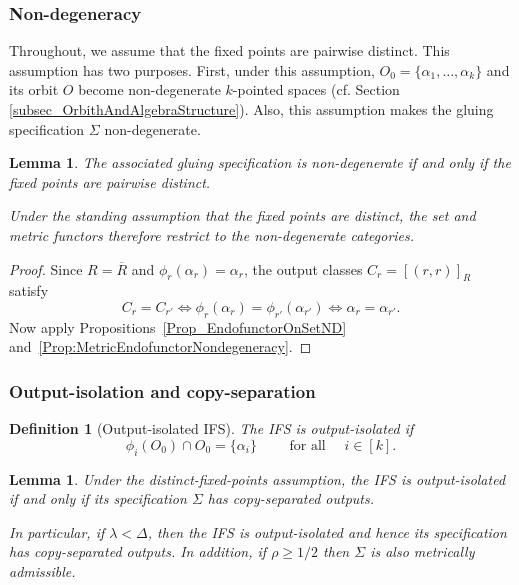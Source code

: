 \documentclass{sn-jnl}%
\theoremstyle{thmstyleone}%
\newtheorem{lemma}[theorem]{Lemma}%
\theoremstyle{thmstyletwo}%
\theoremstyle{thmstylethree}%
\newtheorem{definition}{Definition}%
\newcommand{\f}{\phi}
\newcommand{\w}{\rho}
\begin{document}
\subsubsection{Non-degeneracy}

Throughout, we assume that the fixed points are pairwise distinct. This assumption has two purposes. First, under this assumption, $O_0=\{\alpha_1,\ldots,\alpha_k\}$ and its orbit $O$ become non-degenerate $k$-pointed spaces (cf. Section \ref{subsec_OrbithAndAlgebraStructure}). Also, this assumption makes the gluing specification $\Sigma$ non-degenerate.  

\begin{lemma}
\label{lem:ND-distinct-fixed-points}
    The associated gluing specification is non-degenerate if and only if the fixed points are pairwise distinct. 

    Under the standing assumption that the fixed points are distinct, the set and metric functors therefore restrict to the non-degenerate categories.
\end{lemma}

\begin{proof}
Since $R=\overline R$ and $\f_r(\alpha_r)=\alpha_r$, the output classes $C_r=[(r,r)]_R$ satisfy
\begin{equation} 
\nonumber
    C_r=C_{r'} \iff \f_r(\alpha_r)=\f_{r'}(\alpha_{r'}) \iff \alpha_r=\alpha_{r'}.
\end{equation}
Now apply Propositions~\ref{Prop_EndofunctorOnSetND} and~\ref{Prop:MetricEndofunctorNondegeneracy}.
\end{proof}

\subsubsection{Output-isolation and copy-separation}

\begin{definition}[Output-isolated IFS]
\label{Def:IFSOutputIsolation}
    The IFS is \emph{output-isolated} if
    \begin{equation}
        \f_i(O_0)\cap O_0=\{\alpha_i\}\qquad \text{ for all } \quad i\in[k].
     \label{eqn:Output-isolation}
     \tag{OI}
    \end{equation}
\end{definition}

\begin{lemma}
\label{lem:IFS-OI-iff-CS}
Under the distinct-fixed-points assumption, the IFS is output-isolated if and only if its specification $\Sigma$ has copy-separated outputs.

In particular, if $\lambda<\Delta$, then the IFS is output-isolated and hence its specification has copy-separated outputs. In addition, if $\w \geq 1/2$ then $\Sigma$ is also metrically admissible.
\end{lemma}
\end{document}
